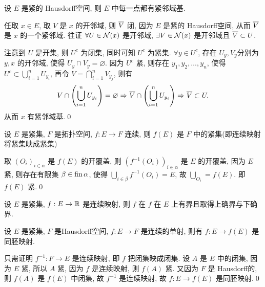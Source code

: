      \begin{Proposition}
          设 $ E $ 是紧的 Hausdorff空间, 则 $ E $ 中每一点都有紧邻域基.
     \end{Proposition}

     \begin{Proof}
          任取 $ x\in E $, 取 $ V $ 是 $ x $ 的开邻域, 则 $ \baro{V} $ 闭, 因为 $ E $ 是紧的 Hausdorff空间, 从而 $ \baro{V} $ 是 $ x $ 的一个紧邻域. 往证 $ \forall U\in\CN(x) $ 是开邻域, $ \exists V\in\CN(x) $ 是开邻域且 $ \baro{V}\subset U $. 
          
          注意到 $ U $ 是开集, 则 $ U^{c} $ 为闭集, 同时可知 $ U^{c} $ 为紧集. $ \forall y\in U^{c} $, 存在  $ U_{y}, V_{y} $分别为 $ y, x $ 的开邻域, 使得 $ U_{y}\cap V_{y}=\varnothing $. 因为 $ U^{c} $ 紧, 则存在 $ y_{1}, y_{2}, \dots, y_{n} $, 使得 $ U^{c}\subset \bigcup_{i=1}^{n}U_{y_{i}} $, 再令 $ V=\bigcap_{i=1}^{n}V_{y_{j}} $, 则有
          \[
               V\cap\left( \bigcup_{i=1}^{n}U_{y_{i}} \right)=\varnothing\Rightarrow \baro{V}\cap\left( \bigcup_{i=1}^{n}U_{y_{i}} \right)\Rightarrow \baro{V}\subset U.
          \]
          从而 $ x $ 有紧邻域基.\qed
     \end{Proof}

     \begin{Proposition}
          设 $ E $ 是紧集,  $ F $ 是拓扑空间,  $ f:E\to F $ 连续, 则 $ f(E) $ 是 $ F $ 中的紧集(即连续映射将紧集映成紧集)
     \end{Proposition}

     \begin{Proof}
          取 $ (O_{i})_{i\in\alpha} $ 是 $ f(E) $ 的开覆盖, 则 $ (f^{-1}(O_{i}))_{i\in\alpha} $ 是 $ E $ 的开覆盖, 因为 $ E $ 紧, 则存在有限集 $ \beta\in\fin\alpha $, 使得 $ \bigcup_{i\in\beta}f^{-1}(O_{i})=E $, 故 $ \bigcup_{O_{i}}=f(E) $. 即 $ f(E) $ 紧.\qed
     \end{Proof}

     \begin{Corollary}
          设 $ E $ 是紧集, $ f:E\to\R $ 是连续映射, 则 $ f $ 在 $ f $ 在 $ E $ 上有界且取得上确界与下确界.
     \end{Corollary}

     \begin{Proposition}
          设 $ E $ 是紧集,  $ F $ 是Hausdorff空间,  $ f:E\to F $ 是连续的单射, 则有 $ f:E\to f(E) $ 是同胚映射.
     \end{Proposition}

     \begin{Proof}
          只需证明 $ f^{-1}:F\to E $ 是连续映射, 即 $ f $ 把闭集映成闭集. 设 $ A $ 是 $ E $ 中的闭集, 因为 $ E $ 紧, 所以 $ A $ 紧, 因为 $ f $ 是连续映射, 则 $ f(A) $ 紧. 又因为 $ F $ 是 Hausdorff的, 则 $ f(A) $ 是 $ f(E) $ 中闭集, 故 $ f^{-1} $ 是连续映射, 故 $ f:E\to f(E) $ 是同胚映射.\qed
     \end{Proof}

